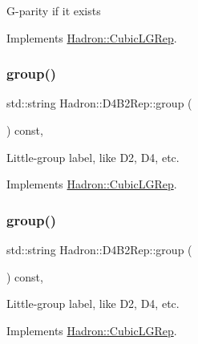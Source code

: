 G-\/parity if it exists 

Implements \mbox{\hyperlink{structHadron_1_1CubicLGRep_ace26f7b2d55e3a668a14cb9026da5231}{Hadron\+::\+Cubic\+L\+G\+Rep}}.

\mbox{\label{structHadron_1_1D4B2Rep_a1d6852d7785e4c17d4ca5ce9c63edda4}} 
\subsubsection{\texorpdfstring{group()}{group()}\hspace{0.1cm}{\footnotesize\ttfamily [1/3]}}
{\footnotesize\ttfamily std\+::string Hadron\+::\+D4\+B2\+Rep\+::group (\begin{DoxyParamCaption}{ }\end{DoxyParamCaption}) const\hspace{0.3cm}{\ttfamily [inline]}, {\ttfamily [virtual]}}

Little-\/group label, like D2, D4, etc. 

Implements \mbox{\hyperlink{structHadron_1_1CubicLGRep_a9bdb14b519a611d21379ed96a3a9eb41}{Hadron\+::\+Cubic\+L\+G\+Rep}}.

\mbox{\label{structHadron_1_1D4B2Rep_a1d6852d7785e4c17d4ca5ce9c63edda4}} 
\subsubsection{\texorpdfstring{group()}{group()}\hspace{0.1cm}{\footnotesize\ttfamily [2/3]}}
{\footnotesize\ttfamily std\+::string Hadron\+::\+D4\+B2\+Rep\+::group (\begin{DoxyParamCaption}{ }\end{DoxyParamCaption}) const\hspace{0.3cm}{\ttfamily [inline]}, {\ttfamily [virtual]}}

Little-\/group label, like D2, D4, etc. 

Implements \mbox{\hyperlink{structHadron_1_1CubicLGRep_a9bdb14b519a611d21379ed96a3a9eb41}{Hadron\+::\+Cubic\+L\+G\+Rep}}.

\mbox{\label{structHadron_1_1D4B2Rep_a1d6852d7785e4c17d4ca5ce9c63edda4}} 
